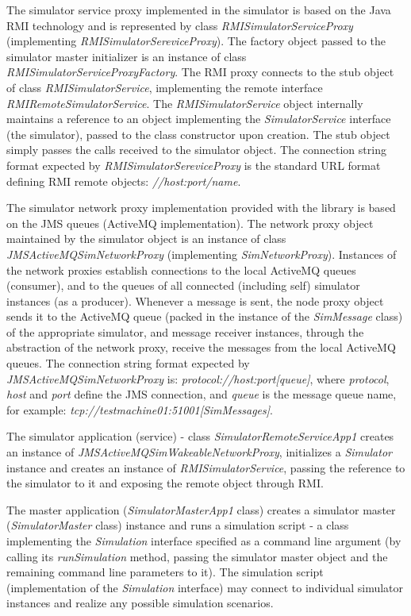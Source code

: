The simulator service proxy implemented in the simulator is based on the Java RMI technology and is represented by class \emph{RMISimulatorServiceProxy} (implementing \emph{RMISimulatorSereviceProxy}). The factory object passed to the simulator master initializer is an instance of class \emph{RMISimulatorServiceProxyFactory}. The RMI proxy connects to the stub object of class \emph{RMISimulatorService}, implementing the remote interface \emph{RMIRemoteSimulatorService}. The \emph{RMISimulatorService} object internally maintains a reference to an object implementing the \emph{SimulatorService} interface (the simulator), passed to the class constructor upon creation. The stub object simply passes the calls received to the simulator object. The connection string format expected by \emph{RMISimulatorSereviceProxy} is the standard URL format defining RMI remote objects: \emph{//host:port/name}.

The simulator network proxy implementation provided with the library is based on the JMS queues (ActiveMQ implementation). The network proxy object maintained by the simulator object is an instance of class \emph{JMSActiveMQSimNetworkProxy} (implementing \emph{SimNetworkProxy}). Instances of the network proxies establish connections to the local ActiveMQ queues (consumer), and to the queues of all connected (including self) simulator instances (as a producer). Whenever a message is sent, the node proxy object sends it to the ActiveMQ queue (packed in the instance of the \emph{SimMessage} class) of the appropriate simulator, and message receiver instances, through the abstraction of the network proxy, receive the messages from the local ActiveMQ queues. The connection string format expected by \emph{JMSActiveMQSimNetworkProxy} is: \emph{protocol://host:port[queue]}, where \emph{protocol}, \emph{host} and \emph{port} define the JMS connection, and \emph{queue} is the message queue name, for example: \emph{tcp://testmachine01:51001[SimMessages]}.

The simulator application (service) - class \emph{SimulatorRemoteServiceApp1} creates an instance of \emph{JMSActiveMQSimWakeableNetworkProxy}, initializes a \emph{Simulator} instance and creates an instance of \emph{RMISimulatorService}, passing the reference to the simulator to it and exposing the remote object through RMI.

The master application (\emph{SimulatorMasterApp1} class) creates a simulator master (\emph{SimulatorMaster} class) instance and runs a simulation script - a class implementing the \emph{Simulation} interface specified as a command line argument (by calling its \emph{runSimulation} method, passing the simulator master object and the remaining command line parameters to it). The simulation script (implementation of the \emph{Simulation} interface) may connect to individual simulator instances and realize any possible simulation scenarios.







